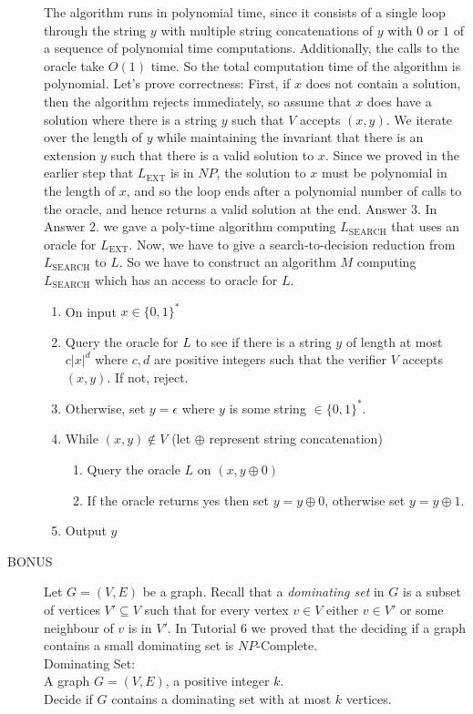 \documentclass{csc_assignment}
\begin{document}
\begin{description}
  The algorithm runs in polynomial time, since it consists of a single loop through the string $y$ with multiple string concatenations of $y$ with $0$ or $1$ of a sequence of polynomial time computations. Additionally, the calls to the oracle take $O(1)$ time. So the total computation time of the algorithm is polynomial. Let's prove correctness: First, if $x$ does not contain a solution, then the algorithm rejects immediately, so assume that $x$ does have a solution where there is a string $y$ such that $V$ accepts $(x, y)$. We iterate over the length of $y$ while maintaining the invariant that there is an extension $y$ such that there is a valid solution to $x$. Since we proved in the earlier step that $L_{\text{EXT}}$ is in $NP$, the solution to $x$ must be polynomial in the length of $x$, and so the loop ends after a polynomial number of calls to the oracle, and hence returns a valid solution at the end.
  \newpage
  Answer 3. In Answer 2. we gave a poly-time algorithm computing $L_{\text{SEARCH}}$ that uses an oracle for $L_{\text{EXT}}$. Now, we have to give a search-to-decision reduction from $L_{\text{SEARCH}}$ to $L$. So we have to construct an algorithm $M$ computing $L_{\text{SEARCH}}$ which has an access to oracle for $L$. \begin{enumerate}
  \item On input $x \in \{0, 1\}^{*}$
  \item Query the oracle for $L$ to see if there is a string $y$ of length at most $c|x|^{d}$ where $c, d$ are positive integers such that the verifier $V$ accepts $(x, y)$. If not, reject.
  \item Otherwise, set $y = \epsilon$ where $y$ is some string $\in \{0, 1\}^{*}$.
  \item While $(x, y) \notin V$ (let $\oplus$ represent string concatenation) 
  \begin{enumerate} 
  \item Query the oracle $L$ on $(x, y \oplus 0)$
  \item If the oracle returns yes then set $y = y \oplus 0$, otherwise set $y = y \oplus 1$.
  \end{enumerate}
  \item Output $y$
  \end{enumerate}


\newpage
\item[BONUS]
  Let $G = (V, E)$ be a graph.
  Recall that a \emph{dominating set} in $G$ is a subset of vertices $V' \subseteq V$ such that for every vertex $v \in V$ either $v \in V'$ or some neighbour of $v$ is in $V'$.
  In Tutorial 6 we proved that the deciding if a graph contains a small dominating set is $NP$-Complete.\\
Dominating Set:\\
A graph $G = (V, E)$, a positive integer $k$.\\
Decide if $G$ contains a dominating set with at most $k$ vertices.
  

\end{description}
\end{document}
